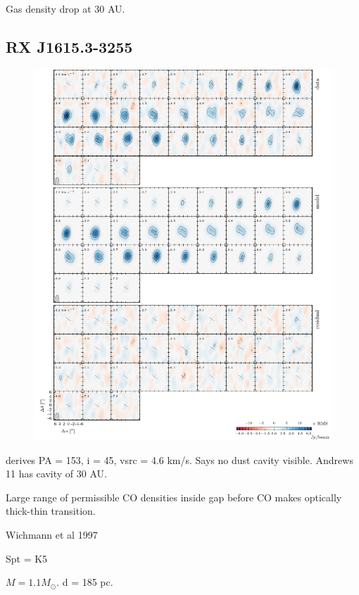 \documentclass[twocolumn]{aastex6}
\begin{document}
Gas density drop at 30 AU.

\subsection{RX J1615.3-3255}
\begin{figure}[htb]
\begin{center}
  \includegraphics{RXJ1615.pdf}
  \end{center}
\end{figure}

\citep{vandermarel15} derives PA = 153, i = 45, vsrc = 4.6 km/s. Says no dust cavity visible. Andrews 11 has cavity of 30 AU.

Large range of permissible CO densities inside gap before CO makes optically thick-thin transition.

\citep{andrews11}
Wichmann et al 1997

Spt = K5

$M = 1.1 M_\odot$.
d = 185 pc.
\end{document}
